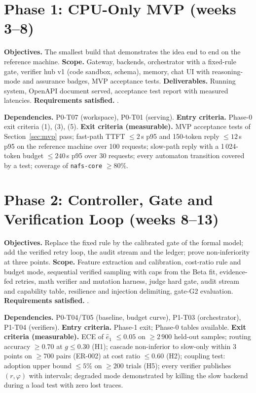\documentclass[11pt,a4paper]{article}
\begin{document}
\section{Phase 1: CPU-Only MVP (weeks 3--8)}
\textbf{Objectives.} The smallest build that demonstrates the idea end to end on the reference machine. \textbf{Scope.} Gateway, backends, orchestrator with a fixed-rule gate, verifier hub v1 (code sandbox, schema), memory, chat UI with reasoning-mode and assurance badges, MVP acceptance tests. \textbf{Deliverables.} Running system, OpenAPI document served, acceptance test report with measured latencies. \textbf{Requirements satisfied.} \ReqsPhaseB.
\par\medskip\noindent\TasksPhaseB
\par\medskip\noindent\textbf{Dependencies.} P0-T07 (workspace), P0-T01 (serving). \textbf{Entry criteria.} Phase-0 exit criteria (1), (3), (5). \textbf{Exit criteria (measurable).} MVP acceptance tests of Section~\ref{sec:mvp} pass; fast-path TTFT $\le2$\,s p95 and 150-token reply $\le12$\,s p95 on the reference machine over 100 requests; slow-path reply with a 1\,024-token budget $\le240$\,s p95 over 30 requests; every automaton transition covered by a test; coverage of \texttt{nafs-core} $\ge80\%$.

\section{Phase 2: Controller, Gate and Verification Loop (weeks 8--13)}
\textbf{Objectives.} Replace the fixed rule by the calibrated gate of the formal model; add the verified retry loop, the audit stream and the ledger; prove non-inferiority at three points. \textbf{Scope.} Feature extraction and calibration, cost-ratio rule and budget mode, sequential verified sampling with caps from the Beta fit, evidence-fed retries, math verifier and mutation harness, judge hard gate, audit stream and capability table, resilience and injection delimiting, gate-G2 evaluation. \textbf{Requirements satisfied.} \ReqsPhaseC.
\par\medskip\noindent\TasksPhaseC
\par\medskip\noindent\textbf{Dependencies.} P0-T04/T05 (baseline, budget curve), P1-T03 (orchestrator), P1-T04 (verifiers). \textbf{Entry criteria.} Phase-1 exit; Phase-0 tables available. \textbf{Exit criteria (measurable).} ECE of $\hat e_1$ $\le0.05$ on $\ge2\,900$ held-out samples; routing accuracy $\ge0.70$ at $g\le0.30$ (H1); cascade non-inferior to slow-only within 3 points on $\ge700$ pairs (ER-002) at cost ratio $\le0.60$ (H2); coupling test: adoption upper bound $\le5\%$ on $\ge200$ trials (H5); every verifier publishes $(r,\varphi)$ with intervals; degraded mode demonstrated by killing the slow backend during a load test with zero lost traces.
\end{document}
